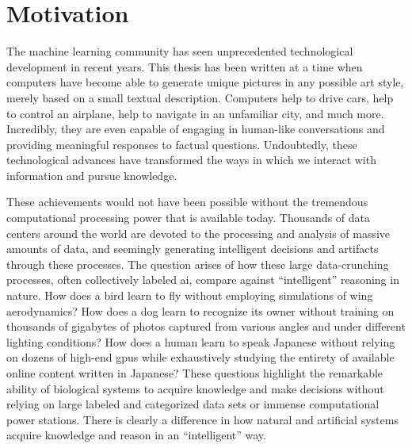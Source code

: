 \section{Motivation}\label{chapter-01:section:motivation}

The machine learning community has seen unprecedented technological development in recent
years.
This thesis has been written at a time when computers have become able to generate unique
pictures in any possible art style, merely based on a small textual description.
Computers help to drive cars, help to control an airplane, help to navigate in an unfamiliar
city, and much more.
Incredibly, they are even capable of engaging in human-like conversations and providing
meaningful responses to factual questions.
Undoubtedly, these technological advances have transformed the ways in which we interact with
information and pursue knowledge.

These achievements would not have been possible without the tremendous computational
processing power that is available today.
Thousands of data centers around the world are devoted to the processing and analysis of
massive amounts of data, and seemingly generating intelligent decisions and artifacts through
these processes.
The question arises of how these large data-crunching processes, often collectively labeled
\ac{ai}, compare against ``intelligent'' reasoning in nature.
How does a bird learn to fly without employing simulations of wing aerodynamics?
How does a dog learn to recognize its owner without training on thousands of gigabytes of
photos captured from various angles and under different lighting conditions?
How does a human learn to speak Japanese without relying on dozens of high-end \acp{gpu} 
while exhaustively studying the entirety of available online content
written in Japanese?
These questions highlight the remarkable ability of biological systems to acquire
knowledge and make decisions without relying on large labeled and categorized data sets or
immense computational power stations.
There is clearly a difference in how natural and artificial systems acquire knowledge and
reason in an ``intelligent'' way.

